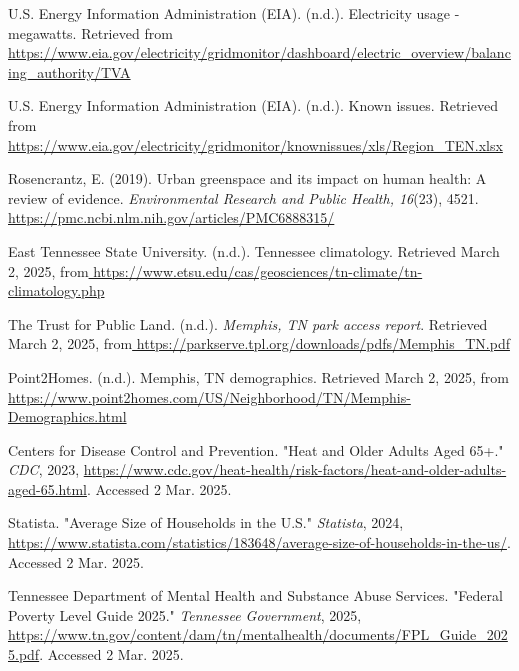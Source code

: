 \documentclass{article}
\begin{document}
\begin{thebibliography}{9}
 U.S. Energy Information Administration (EIA). (n.d.). Electricity usage - megawatts. Retrieved from\href{https://www.eia.gov/electricity/gridmonitor/dashboard/electric_overview/balancing_authority/TVA}{ https://www.eia.gov/electricity/gridmonitor/dashboard/electric\_overview/balancing\_authority/TVA }

 U.S. Energy Information Administration (EIA). (n.d.). Known issues. Retrieved from\href{https://www.eia.gov/electricity/gridmonitor/knownissues/xls/Region_TEN.xlsx}{ https://www.eia.gov/electricity/gridmonitor/knownissues/xls/Region\_TEN.xlsx }

Rosencrantz, E. (2019). Urban greenspace and its impact on human health: A review of evidence. \textit{Environmental Research and Public Health, 16}(23), 4521.\href{https://pmc.ncbi.nlm.nih.gov/articles/PMC6888315/}{ https://pmc.ncbi.nlm.nih.gov/articles/PMC6888315/ }

 East Tennessee State University. (n.d.). Tennessee climatology. Retrieved March 2, 2025, from\href{https://www.etsu.edu/cas/geosciences/tn-climate/tn-climatology.php}{ https://www.etsu.edu/cas/geosciences/tn-climate/tn-climatology.php }

 The Trust for Public Land. (n.d.). \textit{Memphis, TN park access report}. Retrieved March 2, 2025, from\href{https://parkserve.tpl.org/downloads/pdfs/Memphis_TN.pdf}{ https://parkserve.tpl.org/downloads/pdfs/Memphis\_TN.pdf }

 Point2Homes. (n.d.). Memphis, TN demographics. Retrieved March 2, 2025, from\href{https://www.point2homes.com/US/Neighborhood/TN/Memphis-Demographics.html}{ https://www.point2homes.com/US/Neighborhood/TN/Memphis-Demographics.html}

Centers for Disease Control and Prevention. "Heat and Older Adults Aged 65+." \textit{CDC}, 2023, 
\url{https://www.cdc.gov/heat-health/risk-factors/heat-and-older-adults-aged-65.html}. Accessed 2 Mar. 2025.


Statista. "Average Size of Households in the U.S." \textit{Statista}, 2024, 
\url{https://www.statista.com/statistics/183648/average-size-of-households-in-the-us/}. Accessed 2 Mar. 2025.

Tennessee Department of Mental Health and Substance Abuse Services. "Federal Poverty Level Guide 2025." \textit{Tennessee Government}, 2025, 
\url{https://www.tn.gov/content/dam/tn/mentalhealth/documents/FPL_Guide_2025.pdf}. Accessed 2 Mar. 2025.
\end{thebibliography}
\end{document}
